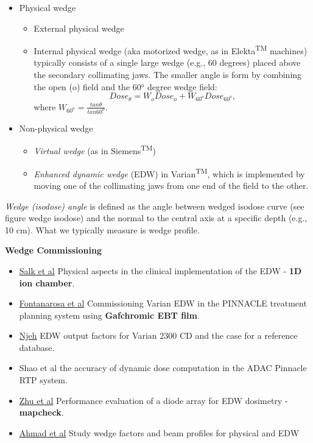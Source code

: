 \documentclass[]{book}
\providecommand{\tightlist}{%
  \setlength{\itemsep}{0pt}\setlength{\parskip}{0pt}}
\theoremstyle{definition}
\theoremstyle{definition}
\theoremstyle{definition}
\theoremstyle{remark}
\begin{document}
\begin{itemize}
\tightlist
\item
  Physical wedge

  \begin{itemize}
  \tightlist
  \item
    External physical wedge
  \item
    Internal physical wedge (aka motorized wedge, as in
    Elekta\textsuperscript{TM} machines) typically consists of a single
    large wedge (e.g., 60 degrees) placed above the secondary
    collimating jaws. The smaller angle is form by combining the open
    (o) field and the 60\(^o\) degree wedge field:
    \[ Dose_{\theta}=W_{o}Dose_{o} + W_{60^o}Dose_{60^o},\] where
    \(W_{60^o}=\frac{tan\theta}{tan{60^o}}\).
  \end{itemize}
\item
  Non-physical wedge

  \begin{itemize}
  \tightlist
  \item
    \emph{Virtual wedge} (as in Siemens\textsuperscript{TM})
  \item
    \emph{Enhanced dynamic wedge} (EDW) in Varian\textsuperscript{TM},
    which is implemented by moving one of the collimating jaws from one
    end of the field to the other.
  \end{itemize}
\end{itemize}

\emph{Wedge (isodose) angle} is defined as the angle between wedged
isodose curve (see figure wedge isodose) and the normal to the central
axis at a specific depth (e.g., 10 cm). What we typically measure is
wedge profile.

\textbf{Wedge Commissioning}

\begin{itemize}
\tightlist
\item
  \href{http://www.uni-ulm.de/~jsalk/edw/edw.pdf}{Salk et al} Physical
  aspects in the clinical implementation of the EDW - \textbf{1D ion
  chamber}.
\item
  \href{https://www.ncbi.nlm.nih.gov/pubmed/19928081}{Fontanarosa et al}
  Commissioning Varian EDW in the PINNACLE treatment planning system
  using \textbf{Gafchromic EBT film}.
\item
  \href{http://onlinelibrary.wiley.com/doi/10.1120/jacmp.v16i5.5498/full}{Njeh}
  EDW output factors for Varian 2300 CD and the case for a reference
  database.
\item
  Shao et al the accuracy of dynamic dose computation in the ADAC
  Pinnacle RTP system.
\item
  \href{http://onlinelibrary.wiley.com/doi/10.1118/1.598019/epdf}{Zhu et
  al} Performance evaluation of a diode array for EDW dosimetry -
  \textbf{mapcheck}.
\item
  \href{http://www.jmp.org.in/article.asp?issn=0971-6203;year=2010;volume=35;issue=1;spage=33;epage=41;aulast=Ahmad}{Ahmad
  et al} Study wedge factors and beam profiles for physical and EDW
\end{itemize}
\end{document}
